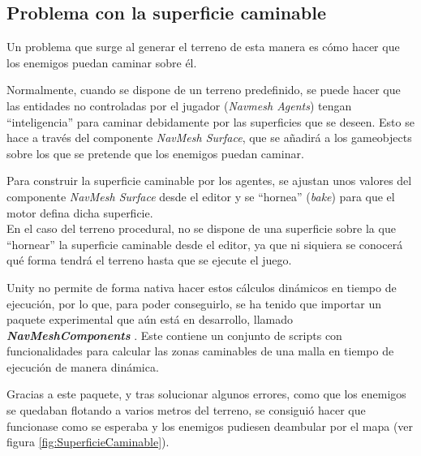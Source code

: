 \begin{enumerate}
    \subsection{Problema con la superficie caminable}
    Un problema que surge al generar el terreno de esta manera es cómo hacer que los enemigos puedan caminar sobre él.
    
    Normalmente, cuando se dispone de un terreno predefinido, se puede hacer que las entidades no controladas por el jugador (\textit{Navmesh Agents})  tengan ``inteligencia'' para caminar debidamente por las superficies que se deseen. Esto se hace a través del componente \textit{NavMesh Surface}, que se añadirá a los gameobjects sobre los que se pretende que los enemigos puedan caminar. 
    
    Para construir la superficie caminable por los agentes, se ajustan unos valores del componente \textit{NavMesh Surface} desde el editor y se ``hornea'' (\textit{bake}) para que el motor defina dicha superficie.\\
    En el caso del terreno procedural, no se dispone de una superficie sobre la que ``hornear'' la superficie caminable desde el editor, ya que ni siquiera se conocerá qué forma tendrá el terreno hasta que se ejecute el juego.
    
    Unity no permite de forma nativa hacer estos cálculos dinámicos en tiempo de ejecución, por lo que, para poder conseguirlo, se ha tenido que importar un paquete experimental que aún está en desarrollo, llamado \textbf{\textit{NavMeshComponents}} \cite{wiki:NavMeshComponents}. Este contiene un conjunto de scripts con funcionalidades para calcular las zonas caminables de una malla en tiempo de ejecución de manera dinámica.
    
    Gracias a este paquete, y tras solucionar algunos errores, como que los enemigos se quedaban flotando a varios metros del terreno, se consiguió hacer que funcionase como se esperaba y los enemigos pudiesen deambular por el mapa (ver figura \ref{fig:SuperficieCaminable}).
    

\end{enumerate}

